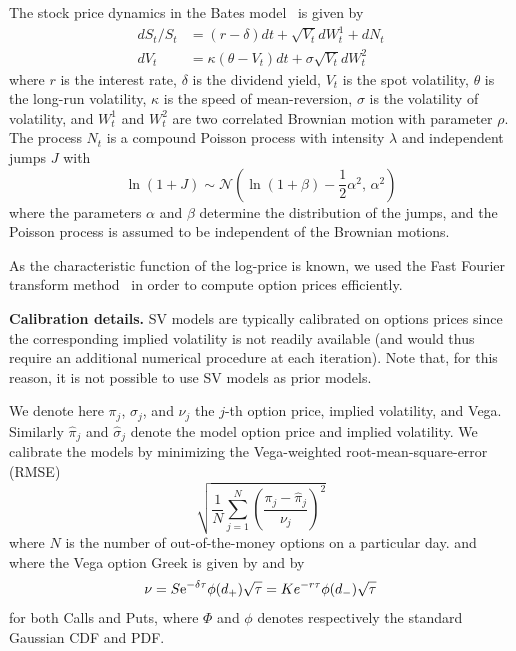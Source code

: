 The stock price dynamics in the Bates model~\cite{bates1996jumps} is given by
\begin{align*}
dS_t/S_t &= (r - \delta)dt+ \sqrt{V_t} dW^1_t + dN_t \\
dV_t &= \kappa(\theta - V_t)dt + \sigma \sqrt{V_t} dW^2_t
\end{align*}
where $r$ is the interest rate, $\delta$ is the dividend yield, $V_t$ is the spot volatility, $\theta$ is the long-run volatility, $\kappa$ is the speed of mean-reversion, $\sigma$ is the volatility of volatility, and $W^1_t$ and $W^2_t$ are two correlated Brownian motion with parameter $\rho$. 
The process $N_t$ is a compound Poisson process with intensity $\lambda$ and independent jumps $J$ with
\begin{equation*}
\ln(1+ J) \sim \mathcal{N}\left(\ln(1 + \beta) -\frac{1}{2}\alpha^2, \,  \alpha^2 \right)
\end{equation*}
where the parameters $\alpha$ and $\beta$ determine the distribution of the jumps, and the Poisson process is assumed to be independent of the Brownian motions.

As the characteristic function of the log-price is known, we used the Fast Fourier transform method~\cite{carr1999option} in order to compute option prices efficiently.

\textbf{Calibration details.}
SV models are typically calibrated on options prices since the corresponding implied volatility is not readily available (and would thus require an additional numerical procedure at each iteration).
Note that, for this reason, it is not possible to use SV models as prior models.

We denote here $\pi_{j}$, $\sigma_{j}$, and $\nu_{j}$ the $j$-th option price, implied volatility, and Vega.
Similarly $\hat{\pi}_{j}$ and $\hat{\sigma}_{j}$ denote the model option price and implied volatility.
We calibrate the models by minimizing the Vega-weighted root-mean-square-error (RMSE)
\begin{equation}\label{eq:vegaloss}
\sqrt{\frac{1}{N}\sum_{j=1}^{N} \left(\frac{\pi_{j}-\hat{\pi}_{j}}{\nu_{j}}\right)^2 }
\end{equation}
where $N$ is the number of out-of-the-money options on a particular day.
and where the Vega option Greek is given by
and by\begin{equation*}
\nu = S {\rm e}^{-\delta \tau} \phi(d_+)\sqrt{\tau} = K e^{-r \tau} \phi(d_-)\sqrt{\tau}
\end{equation*}
for both Calls and Puts, where $\Phi$ and $\phi$ denotes respectively the standard Gaussian CDF and PDF.

